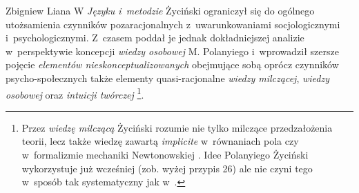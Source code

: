 \begin{artplenv}{Zbigniew Liana}
W \textit{Języku i~metodzie} Życiński ograniczył się do ogólnego utożsamienia czynników pozaracjonalnych z~uwarunkowaniami
socjologicznymi i~psychologicznymi. Z~czasem poddał je jednak dokładniejszej analizie w~perspektywie koncepcji
\textit{wiedzy osobowej} M. Polanyiego i~wprowadził szersze pojęcie \textit{elementów nieskonceptualizowanych} obejmujące
sobą oprócz czynników psycho-społecznych także elementy quasi-racjonalne \textit{wiedzy milczącej}, \textit{wiedzy osobowej}
oraz \textit{intuicji twórczej}
\parencite[zob.][s.~179–191]{zycinski_elementy_1996}\footnote{Przez
\textit{wiedzę milczącą} Życiński rozumie nie tylko milczące przedzałożenia teorii, lecz także wiedzę zawartą
\textit{implicite} w~równaniach pola czy w~formalizmie mechaniki Newtonowskiej
\parencite[zob.][s.~189]{zycinski_elementy_1996}.
Idee Polanyiego Życiński wykorzystuje już wcześniej (zob. wyżej przypis 26) ale nie czyni
tego w~sposób tak systematyczny jak w~\parencite*{zycinski_elementy_1996}.}.


\end{artplenv}
